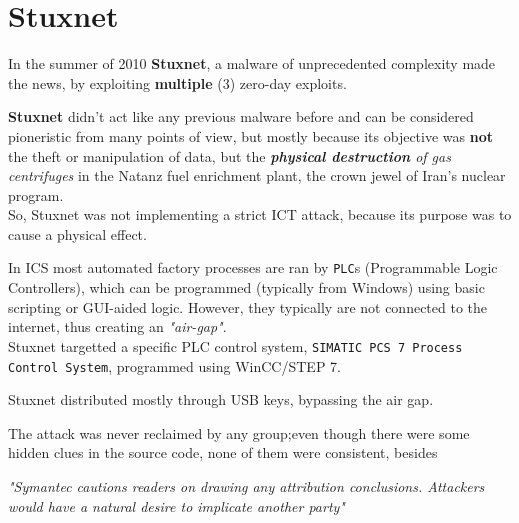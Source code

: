 \chapter{Stuxnet}

In the summer of 2010 \textbf{Stuxnet}, a malware of unprecedented complexity made the
news, by exploiting \textbf{multiple} (3) zero-day exploits.

\textbf{Stuxnet} didn’t act like any previous malware before and can be considered pioneristic from many points of view, 
but mostly
because its objective was \textbf{not} the theft or manipulation of data,
but the \textit{\textbf{physical destruction} of gas centrifuges} in the Natanz fuel
enrichment plant, the crown jewel of Iran’s nuclear program.\\
So, Stuxnet was not implementing a strict ICT attack, because its purpose was to cause a physical effect.

In ICS most automated factory processes are ran by \texttt{PLC}s (Programmable Logic Controllers),
which can be programmed (typically from Windows) using basic scripting or GUI-aided logic.
However, they typically are not connected to the internet, thus creating an \textit{"air-gap"}.\\
Stuxnet targetted a specific PLC control system, \texttt{SIMATIC PCS 7 Process Control System}, programmed using WinCC/STEP 7.

Stuxnet distributed mostly through USB keys, bypassing the air gap.

\nl

The attack was never reclaimed by any group;even though there were some hidden clues in the source code, none of them were consistent, besides
\begin{center}
   \textit{"Symantec cautions readers on drawing any attribution conclusions.
   Attackers would have a natural desire to implicate another party"}
\end{center}